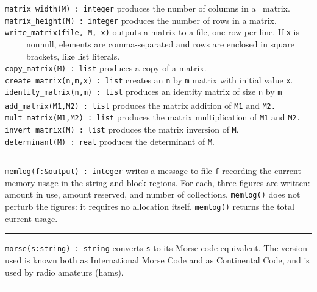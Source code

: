 \texttt{matrix\_width(M) : integer} produces the number of columns in a
\ matrix.\\
\texttt{matrix\_height(M) : integer} produces the number of rows in a
matrix.\\
\texttt{write\_matrix(file, M, x)} outputs a matrix to a file, one row
per line. If \texttt{x} is\\
 \ \ \ \ \ nonnull, elements are comma-separated and rows are enclosed
in square\\
 \ \ \ \ \ brackets, like list literals.\\
\texttt{copy\_matrix(M) : list} produces a copy of a matrix.\\
\texttt{create\_matrix(n,m,x) : list} creates an \texttt{n} by
\texttt{m} matrix with initial value \texttt{x}.\\
\texttt{identity\_matrix(n,m) : list} produces an identity matrix of
size \texttt{n} by \texttt{m}\textsubscript{.}\\
\texttt{add\_matrix(M1,M2) : list} produces the matrix addition of
\texttt{M1} and \texttt{M2.}\\
\texttt{mult\_matrix(M1,M2) : list} produces the matrix multiplication
of \texttt{M1} and \texttt{M2.}\\
\texttt{invert\_matrix(M) : list} produces the matrix inversion of
\texttt{M}.\\
\texttt{determinant(M) : real} produces the determinant of \texttt{M}.


\vspace{0.25cm}\hrule{}

\texttt{memlog(f:\&output) : integer} writes a message to file
\texttt{f} recording the current memory usage in the string and block
regions. For each, three figures are written: amount in use, amount
reserved, and number of collections. \texttt{memlog()} does not perturb
the figures: it requires no allocation itself. \texttt{memlog()}
returns the total current usage.

\vspace{0.25cm}\hrule{}

\texttt{morse(s:string) : string} converts \texttt{s} to its
Morse code equivalent. The version used is known both
as International Morse Code and as Continental Code, and is used by
radio amateurs (hams).

\vspace{0.25cm}\hrule{}

